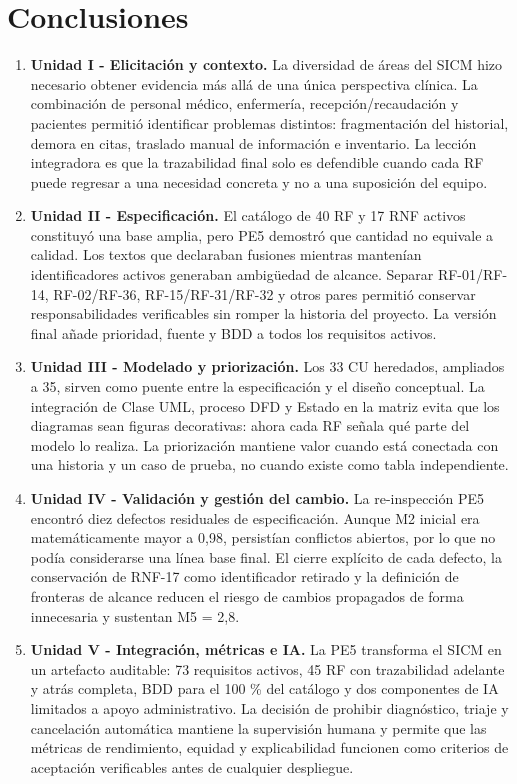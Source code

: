 \documentclass[11pt,a4paper]{article}
\begin{document}
  \section{Conclusiones}
\begin{enumerate}
	\item \textbf{Unidad I - Elicitación y contexto.} La diversidad de áreas del SICM hizo necesario obtener evidencia más allá de una única perspectiva clínica. La combinación de personal médico, enfermería, recepción/recaudación y pacientes permitió identificar problemas distintos: fragmentación del historial, demora en citas, traslado manual de información e inventario. La lección integradora es que la trazabilidad final solo es defendible cuando cada RF puede regresar a una necesidad concreta y no a una suposición del equipo.
	
	\item \textbf{Unidad II - Especificación.} El catálogo de 40 RF y 17 RNF activos constituyó una base amplia, pero PE5 demostró que cantidad no equivale a calidad. Los textos que declaraban fusiones mientras mantenían identificadores activos generaban ambigüedad de alcance. Separar RF-01/RF-14, RF-02/RF-36, RF-15/RF-31/RF-32 y otros pares permitió conservar responsabilidades verificables sin romper la historia del proyecto. La versión final añade prioridad, fuente y BDD a todos los requisitos activos.
	
	\item \textbf{Unidad III - Modelado y priorización.} Los 33 CU heredados, ampliados a 35, sirven como puente entre la especificación y el diseño conceptual. La integración de Clase UML, proceso DFD y Estado en la matriz evita que los diagramas sean figuras decorativas: ahora cada RF señala qué parte del modelo lo realiza. La priorización mantiene valor cuando está conectada con una historia y un caso de prueba, no cuando existe como tabla independiente.
	
	\item \textbf{Unidad IV - Validación y gestión del cambio.} La re-inspección PE5 encontró diez defectos residuales de especificación. Aunque M2 inicial era matemáticamente mayor a 0,98, persistían conflictos abiertos, por lo que no podía considerarse una línea base final. El cierre explícito de cada defecto, la conservación de RNF-17 como identificador retirado y la definición de fronteras de alcance reducen el riesgo de cambios propagados de forma innecesaria y sustentan M5 = 2,8.
	
	\item \textbf{Unidad V - Integración, métricas e IA.} La PE5 transforma el SICM en un artefacto auditable: 73 requisitos activos, 45 RF con trazabilidad adelante y atrás completa, BDD para el 100 \% del catálogo y dos componentes de IA limitados a apoyo administrativo. La decisión de prohibir diagnóstico, triaje y cancelación automática mantiene la supervisión humana y permite que las métricas de rendimiento, equidad y explicabilidad funcionen como criterios de aceptación verificables antes de cualquier despliegue.
\end{enumerate}
\clearpage
\end{document}
